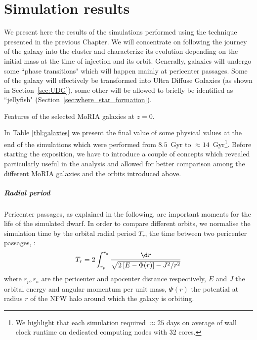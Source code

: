 
\chapter{Simulation results}
\label{ch:sim_results}

We present here the results of the simulations performed using the technique presented in the previous Chapter.
We will concentrate on following the journey of the galaxy into the cluster and characterize its evolution depending on the initial mass at the time of injection and its orbit.
Generally, galaxies will undergo some ``phase transitions" which will happen mainly at pericenter passages.
Some of the galaxy will effectively be transformed into Ultra Diffuse Galaxies (as shown in Section~\ref{sec:UDG}), some other will be allowed to briefly be identified as ``jellyfish" (Section~\ref{sec:where_star_formation}).

\begin{sidewaystable}
 \centering
 \footnotesize
 
 \caption{Features of the selected MoRIA galaxies at $z=0$.} \label{tbl:galaxies}
\end{sidewaystable}

In Table \ref{tbl:galaxies} we present the final value of some physical values at the end of the simulations which were performed from $8.5$~Gyr to $\approx 14$~Gyr\footnote{We highlight that each simulation required $\approx 25$ days on average of wall clock runtime on dedicated computing nodes with 32 cores.
}.
Before starting the exposition, we have to introduce a couple of concepts which revealed particularly useful in the analysis and allowed for better comparison among the different MoRIA galaxies and the orbits introduced above.

\paragraph*{Radial period}
Pericenter passages, as explained in the following, are important moments for the life of the simulated dwarf.
In order to compare different orbits, we normalise the simulation time by the orbital radial period $T_r$, \ie{} the time between two pericenter passages, \citep[p.~146]{BinneyTremaine2008}:
\begin{equation}
    T_r = 2 \int^{r_a}_{r_p} \frac{\d r}{\sqrt{2\left[E-\Phi(r) \right] - J^2/r^2}}
    \label{eq:radial_period}
\end{equation}
where $r_p, r_a$ are the pericenter and apocenter distance respectively, $E$ and $J$ the orbital energy and angular momentum per unit mass, $\Phi(r)$ the potential at radius $r$ of the NFW halo around which the galaxy is orbiting.

